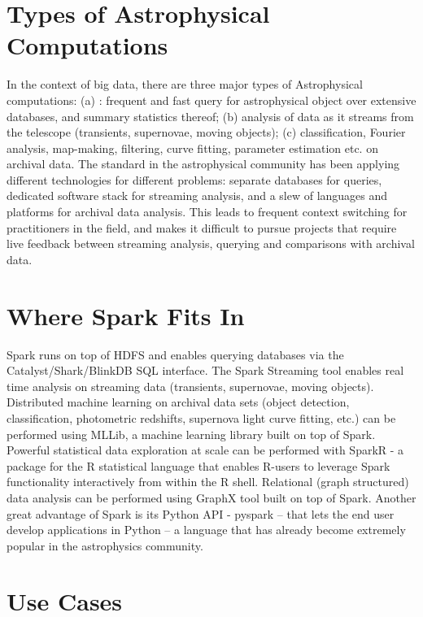 \documentclass[twocolumn, prd]{revtex4}
\begin{document}
\section{Types of Astrophysical Computations}
In the context of big data, there are three major types of Astrophysical computations: (a) : frequent and fast query for astrophysical object over extensive databases, and summary statistics thereof; 
(b)   analysis of data as it streams from the telescope
(transients, supernovae, moving objects); (c)  classification, Fourier analysis, 
map-making, filtering, curve fitting, parameter estimation etc. on archival data. The standard in the astrophysical community has been applying different technologies for different problems: separate databases for queries, dedicated software stack for streaming analysis, and a slew of languages and platforms for archival data analysis.  This leads to frequent context switching for practitioners in the field, and makes it difficult to pursue projects that require live feedback between streaming analysis, querying and comparisons with archival data.  

\section{Where Spark Fits In}
Spark runs on top of  HDFS and enables querying databases via the Catalyst/Shark/BlinkDB SQL interface. The Spark Streaming tool enables real time analysis on streaming data (transients, supernovae, moving objects). Distributed machine learning  on archival  data sets (object detection, classification, photometric redshifts, supernova light curve fitting, etc.) can be performed using  MLLib,  a machine learning library built on top of Spark. Powerful statistical data exploration at scale can be performed with SparkR - a package for the R statistical language that enables R-users to leverage Spark functionality interactively from within the R shell. Relational (graph structured) data analysis can be performed using GraphX tool built on top of Spark.  Another great advantage of Spark is its Python API - pyspark -- that lets the end user develop applications in Python  -- a language that has already become extremely popular in  the astrophysics community. 



\section{Use Cases} 
\end{document}
